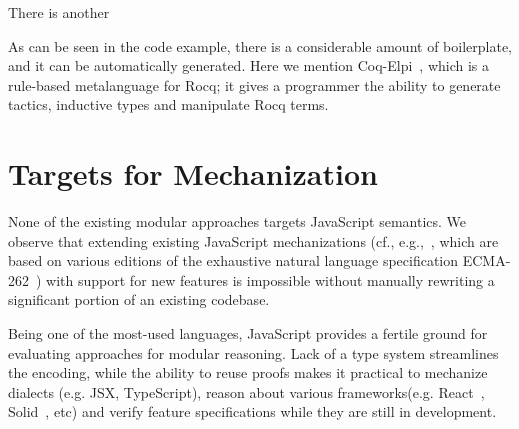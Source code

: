 \documentclass[sigplan,nonacm,review]{acmart}
\begin{document}
There is another 


As can be seen in the code example,
there is a considerable amount of boilerplate,
and it can be automatically generated.
Here we mention Coq-Elpi~\cite{tassi2025elpi}, which is a rule-based metalanguage for Rocq;
it gives a programmer the ability to generate tactics,
inductive types and manipulate Rocq terms.

\section{Targets for Mechanization}


None of the existing modular approaches targets JavaScript semantics.
We observe that extending existing JavaScript mechanizations
(cf., e.g.,~\cite{guha2010essence,bodin2014trusted}, which are based on various editions of the exhaustive natural language specification ECMA-262~\cite{ECMA})
with support for new features
is impossible without manually rewriting a significant portion of an existing codebase.


Being one of the most-used languages, JavaScript provides a fertile ground for evaluating approaches for modular reasoning.
Lack of a type system streamlines the encoding, while the ability to reuse proofs makes it practical to mechanize dialects (e.g. JSX, TypeScript), reason about various frameworks(e.g. React~\cite{React}, Solid~\cite{Solid}, etc) and verify feature specifications while they are still in development. 

\end{document}
